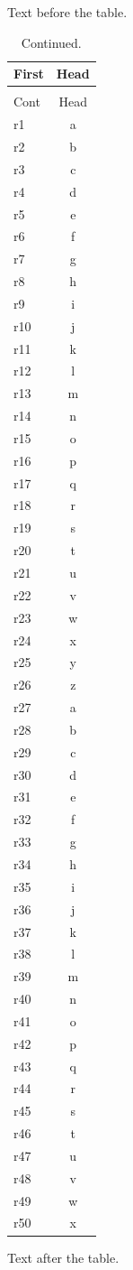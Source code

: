 \documentclass[12pt]{article}
\begin{document}
Text before the table.

\begin{longtable}{lc}
\caption{The first head's caption.}\\
\hline First & Head\\\hline
\endfirsthead
\caption[]{Continued.}\\
\hline Cont & Head\\\hline
\endhead
\hline
\endfoot
\hline\hline
\endlastfoot
r1 & a\\
r2 & b\\
r3 & c\\
r4 & d\\
r5 & e\\
r6 & f\\
r7 & g\\
r8 & h\\
r9 & i\\
r10 & j\\
r11 & k\\
r12 & l\\
r13 & m\\
r14 & n\\
r15 & o\\
r16 & p\\
r17 & q\\
r18 & r\\
r19 & s\\
r20 & t\\
r21 & u\\
r22 & v\\
r23 & w\\
r24 & x\\
r25 & y\\
r26 & z\\
r27 & a\\
r28 & b\\
r29 & c\\
r30 & d\\
r31 & e\\
r32 & f\\
r33 & g\\
r34 & h\\
r35 & i\\
r36 & j\\
r37 & k\\
r38 & l\\
r39 & m\\
r40 & n\\
r41 & o\\
r42 & p\\
r43 & q\\
r44 & r\\
r45 & s\\
r46 & t\\
r47 & u\\
r48 & v\\
r49 & w\\
r50 & x\\
\end{longtable}

Text after the table.
\end{document}
